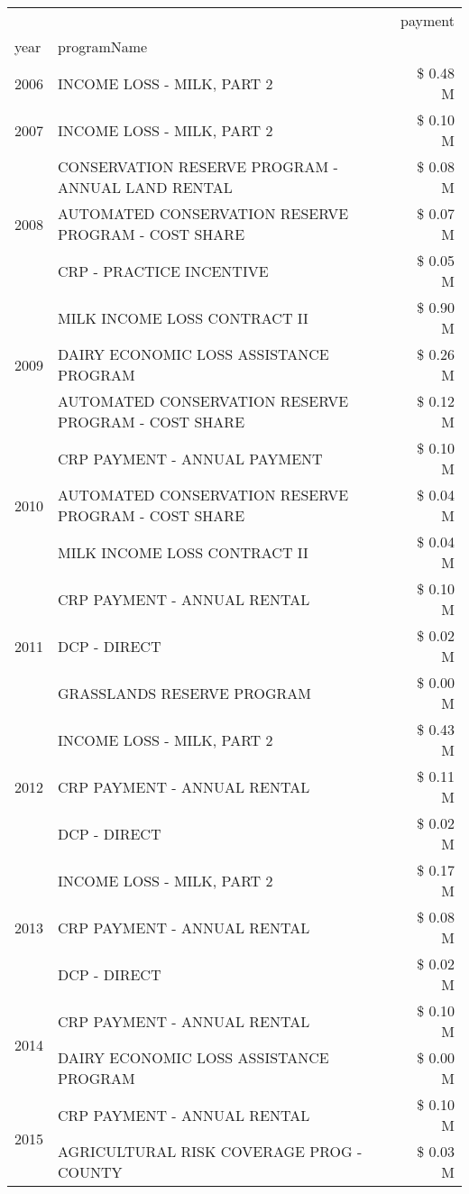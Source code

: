 \begin{tabular}{llr}
\toprule
 &  & payment \\
year & programName &  \\
\midrule
2006 & INCOME LOSS - MILK, PART 2 & \$ 0.48 M \\
\cline{1-3}
2007 & INCOME LOSS - MILK, PART 2 & \$ 0.10 M \\
\cline{1-3}
\multirow[t]{3}{*}{2008} & CONSERVATION RESERVE PROGRAM - ANNUAL LAND RENTAL & \$ 0.08 M \\
 & AUTOMATED CONSERVATION RESERVE PROGRAM - COST SHARE & \$ 0.07 M \\
 & CRP - PRACTICE INCENTIVE & \$ 0.05 M \\
\cline{1-3}
\multirow[t]{3}{*}{2009} & MILK INCOME LOSS CONTRACT II & \$ 0.90 M \\
 & DAIRY ECONOMIC LOSS ASSISTANCE PROGRAM & \$ 0.26 M \\
 & AUTOMATED CONSERVATION RESERVE PROGRAM - COST SHARE & \$ 0.12 M \\
\cline{1-3}
\multirow[t]{3}{*}{2010} & CRP PAYMENT - ANNUAL PAYMENT & \$ 0.10 M \\
 & AUTOMATED CONSERVATION RESERVE PROGRAM - COST SHARE & \$ 0.04 M \\
 & MILK INCOME LOSS CONTRACT II & \$ 0.04 M \\
\cline{1-3}
\multirow[t]{3}{*}{2011} & CRP PAYMENT - ANNUAL RENTAL & \$ 0.10 M \\
 & DCP - DIRECT & \$ 0.02 M \\
 & GRASSLANDS RESERVE PROGRAM & \$ 0.00 M \\
\cline{1-3}
\multirow[t]{3}{*}{2012} & INCOME LOSS - MILK, PART 2 & \$ 0.43 M \\
 & CRP PAYMENT - ANNUAL RENTAL & \$ 0.11 M \\
 & DCP - DIRECT & \$ 0.02 M \\
\cline{1-3}
\multirow[t]{3}{*}{2013} & INCOME LOSS - MILK, PART 2 & \$ 0.17 M \\
 & CRP PAYMENT - ANNUAL RENTAL & \$ 0.08 M \\
 & DCP - DIRECT & \$ 0.02 M \\
\cline{1-3}
\multirow[t]{2}{*}{2014} & CRP PAYMENT - ANNUAL RENTAL & \$ 0.10 M \\
 & DAIRY ECONOMIC LOSS ASSISTANCE PROGRAM & \$ 0.00 M \\
\cline{1-3}
\multirow[t]{2}{*}{2015} & CRP PAYMENT - ANNUAL RENTAL & \$ 0.10 M \\
 & AGRICULTURAL RISK COVERAGE PROG - COUNTY & \$ 0.03 M \\

\end{tabular}
